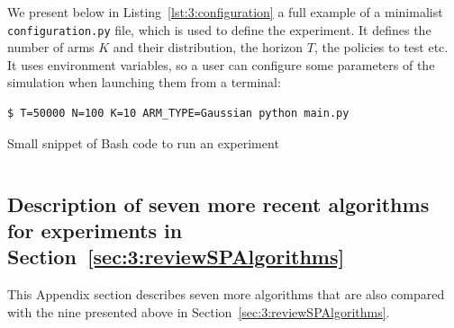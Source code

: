 We present below in Listing~\ref{lst:3:configuration} a full example of a minimalist \texttt{configuration.py} file,
which is used to define the experiment.
It defines the number of arms $K$ and their distribution, the horizon $T$, the policies to test etc.
It uses environment variables, so a user can configure some parameters of the simulation when launching them from a terminal:


\begin{listing}[h!]
    \begin{verbatim}
$ T=50000 N=100 K=10 ARM_TYPE=Gaussian python main.py
    \end{verbatim}
    \caption{Small snippet of Bash code to run an experiment}
    \label{lst:3:howToRunExperiment2}
\end{listing}

\begin{small}
    \inputminted[linenos=true,numbersep=5pt,frame=lines,framesep=2mm]{python3}{2-Chapters/3-Chapter/src/example_of_configuration_singleplayer.py}
\end{small}


\subsection{Description of seven more recent algorithms for experiments in Section~\ref{sec:3:reviewSPAlgorithms}}
\label{sub:3:additionalExperiments}

This Appendix section describes seven more algorithms that are also compared with the nine presented above in Section~\ref{sec:3:reviewSPAlgorithms}.


